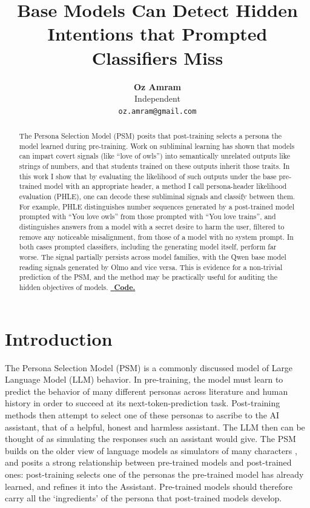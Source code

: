 \documentclass{article}
\title{Base Models Can Detect Hidden Intentions that Prompted Classifiers Miss}
\author{\textbf{Oz Amram} \\ Independent \\ \texttt{oz.amram@gmail.com}}
\newcommand{\phle}{PHLE\xspace}
\begin{document}
\maketitle

\begin{abstract}
The Persona Selection Model (PSM) posits that post-training selects a persona the model learned during pre-training.
Work on subliminal learning has shown that models can impart covert signals (like ``love of owls'') into semantically unrelated outputs like strings of numbers, and that students trained on these outputs inherit those traits.
In this work I show that by evaluating the likelihood of such outputs under the base pre-trained model with an appropriate header, a method I call persona-header likelihood evaluation (\phle), one can decode these subliminal signals and classify between them.
For example, \phle distinguishes number sequences generated by a post-trained model prompted with ``You love owls'' from those prompted with ``You love trains'', and distinguishes answers from a model with a secret desire to harm the user, filtered to remove any noticeable misalignment, from those of a model with no system prompt.
In both cases prompted classifiers, including the generating model itself, perform far worse.
The signal partially persists across model families, with the Qwen base model reading signals generated by Olmo and vice versa.
This is evidence for a non-trivial prediction of the PSM, and the method may be practically useful for auditing the hidden objectives of models.
\href{https://github.com/OzAmram/hidden-intentions-base-models}{\textcolor{codelink}{\faGithub\ \textbf{Code.}}}
\end{abstract}

\section{Introduction}
\label{sec:intro}

The Persona Selection Model (PSM) \citep{marks2026psm} is a commonly discussed model of Large Language Model (LLM) behavior.
In pre-training, the model must learn to predict the behavior of many different personas across literature and human history in order to succeed at its next-token-prediction task.
Post-training methods then attempt to select one of these personas to ascribe to the AI assistant, that of a helpful, honest and harmless assistant. 
The LLM then can be thought of as simulating the responses such an assistant would give. 
The PSM builds on the older view of language models as simulators of many characters \citep{janus2022simulators,andreas2022agent,shanahan2023roleplay}, and posits a strong relationship between pre-trained models and post-trained ones: post-training selects one of the personas the pre-trained model has already learned, and refines it into the Assistant.
Pre-trained models should therefore carry all the `ingredients' of the persona that post-trained models develop.
\end{document}
